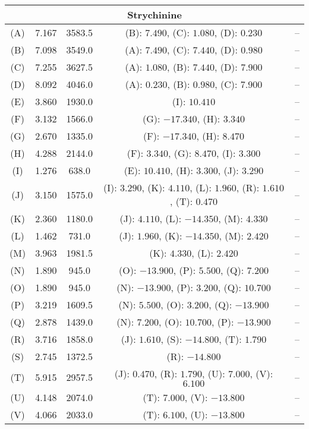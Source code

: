 \begin{longtable}[h!]{c c c c c}
\hline
\multicolumn{5}{c}{\textbf{Strychinine}}\\
\hline
(A) & 7.167 & 3583.5 & (B): $7.490$, (C): $1.080$, (D): $0.230$& -- \\
(B) & 7.098 & 3549.0 & (A): $7.490$, (C): $7.440$, (D): $0.980$& -- \\
(C) & 7.255 & 3627.5 & (A): $1.080$, (B): $7.440$, (D): $7.900$& -- \\
(D) & 8.092 & 4046.0 & (A): $0.230$, (B): $0.980$, (C): $7.900$& -- \\
(E) & 3.860 & 1930.0 & (I): $10.410$& -- \\
(F) & 3.132 & 1566.0 & (G): $-17.340$, (H): $3.340$& -- \\
(G) & 2.670 & 1335.0 & (F): $-17.340$, (H): $8.470$& -- \\
(H) & 4.288 & 2144.0 & (F): $3.340$, (G): $8.470$, (I): $3.300$& -- \\
(I) & 1.276 & 638.0 & (E): $10.410$, (H): $3.300$, (J): $3.290$& -- \\
(J) & 3.150 & 1575.0 & (I): $3.290$, (K): $4.110$, (L): $1.960$, (R): $1.610$, (T): $0.470$& -- \\
(K) & 2.360 & 1180.0 & (J): $4.110$, (L): $-14.350$, (M): $4.330$& -- \\
(L) & 1.462 & 731.0 & (J): $1.960$, (K): $-14.350$, (M): $2.420$& -- \\
(M) & 3.963 & 1981.5 & (K): $4.330$, (L): $2.420$& -- \\
(N) & 1.890 & 945.0 & (O): $-13.900$, (P): $5.500$, (Q): $7.200$& -- \\
(O) & 1.890 & 945.0 & (N): $-13.900$, (P): $3.200$, (Q): $10.700$& -- \\
(P) & 3.219 & 1609.5 & (N): $5.500$, (O): $3.200$, (Q): $-13.900$& -- \\
(Q) & 2.878 & 1439.0 & (N): $7.200$, (O): $10.700$, (P): $-13.900$& -- \\
(R) & 3.716 & 1858.0 & (J): $1.610$, (S): $-14.800$, (T): $1.790$& -- \\
(S) & 2.745 & 1372.5 & (R): $-14.800$& -- \\
(T) & 5.915 & 2957.5 & (J): $0.470$, (R): $1.790$, (U): $7.000$, (V): $6.100$& -- \\
(U) & 4.148 & 2074.0 & (T): $7.000$, (V): $-13.800$& -- \\
(V) & 4.066 & 2033.0 & (T): $6.100$, (U): $-13.800$& -- \\

\hline
\end{longtable}
